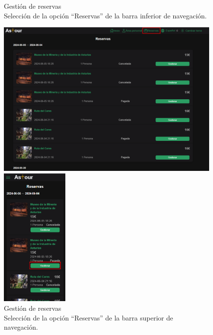\begin{figure}[H]
\begin{minipage}{0.45\textwidth}
		\caption{Gestión de reservas \\ Selección de la opción “Reservas” de la barra inferior de navegación.}
		\label{fig:opcion-app-reservas}
	\end{minipage}
\end{figure}

\begin{figure}[H]
	\begin{minipage}{0.40\textwidth}
		\centering
		\includegraphics[width=1\textwidth]{7-Construccion/Manuales/web/reservas opcion.png}
		\caption{Gestión de reservas \\ Selección de la opción “Reservas” de la barra superior de navegación.}
		\label{fig:opcion-web-reservas}
	\end{minipage}
	\hfill
	\begin{minipage}{0.5\textwidth}
		\centering
		\includegraphics[width=0.3\textwidth]{7-Construccion/Manuales/mobile/gestionar.png}

\end{minipage}
\end{figure}
